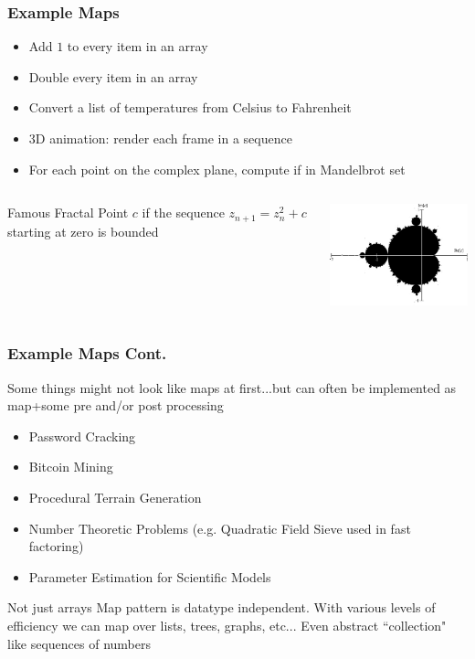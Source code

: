 \documentclass[xcolor=dvipsnames]{beamer}
\begin{document}
		\begin{frame} \frametitle{Example Maps}
			\begin{itemize}
				\item Add $1$ to every item in an array
				\item Double every item in an array
				\item Convert a list of temperatures from Celsius to Fahrenheit
				\item 3D animation: render each frame in a sequence
				\item For each point on the complex plane, compute if in Mandelbrot 
				set
			\end{itemize}
			\begin{columns}
	  			\begin{column}{0.4\textwidth}
					\begin{block}{Famous Fractal}
						Point $c$ if the sequence $z_{n+1} = z_n^2 + c$ starting at
						zero is bounded
					\end{block}
			    \end{column}
			    \begin{column}{0.6\textwidth}
					\includegraphics[width=60mm]{Images/Mandelset_hires.png}
				\end{column}
			\end{columns}
		\end{frame}
			
		\begin{frame} \frametitle{Example Maps Cont.}
			Some things might not look like maps at first...but can often be 
			implemented as map+some pre and/or post processing
			\begin{itemize}
			    \item Password Cracking
			    \item Bitcoin Mining
			    \item Procedural Terrain Generation 
			    \item Number Theoretic Problems (e.g. Quadratic Field Sieve
                used in fast factoring)
			    \item Parameter Estimation for Scientific Models
			\end{itemize}
			\begin{alertblock}{Not just arrays}
				Map pattern is datatype independent.  With various levels of 
				efficiency we can map over lists, trees, graphs, etc... Even 
				abstract ``collection" like sequences of numbers
			\end{alertblock}
		\end{frame}
			
\end{document}
